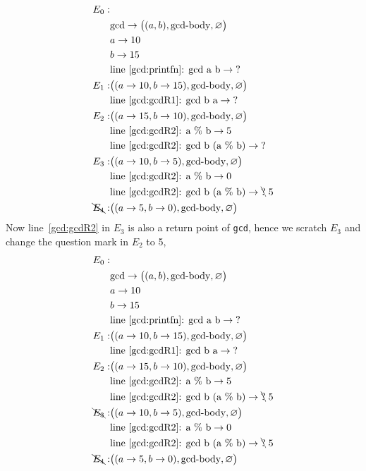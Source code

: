 \begin{align*}
  E_0:&\\
      & \text{gcd} \rightarrow \big((a, b), \text{gcd-body}, \varnothing\big)\\
      & a \rightarrow 10\\
      & b \rightarrow 15\\
      & \text{line~\ref{gcd:printfn}: gcd a b} \rightarrow \text{?}\\
  E_1:& \big((a \rightarrow 10, b \rightarrow 15), \text{gcd-body}, \varnothing\big)\\
      & \text{line~\ref{gcd:gcdR1}: gcd b a} \rightarrow \text{?}\\
  E_2:& \big((a \rightarrow 15, b \rightarrow 10), \text{gcd-body}, \varnothing\big)\\
      & \text{line~\ref{gcd:gcdR2}: a \% b} \rightarrow 5\\
      & \text{line~\ref{gcd:gcdR2}: gcd b (a \% b)} \rightarrow \text{?}\\
  E_3:& \big((a \rightarrow 10, b \rightarrow 5), \text{gcd-body}, \varnothing\big)\\
      & \text{line~\ref{gcd:gcdR2}: a \% b} \rightarrow 0\\
      & \text{line~\ref{gcd:gcdR2}: gcd b (a \% b)} \rightarrow \bcancel{\text{?}}\; 5\\
  \bcancel{E_4}:& \big((a \rightarrow 5, b \rightarrow 0), \text{gcd-body}, \varnothing\big)\\
\end{align*}
Now line~\ref{gcd:gcdR2} in $E_3$ is also a return point of \lstinline!gcd!, hence we scratch $E_3$ and change the question mark in $E_2$ to 5,
\begin{align*}
  E_0:&\\
      & \text{gcd} \rightarrow \big((a, b), \text{gcd-body}, \varnothing\big)\\
      & a \rightarrow 10\\
      & b \rightarrow 15\\
      & \text{line~\ref{gcd:printfn}: gcd a b} \rightarrow \text{?}\\
  E_1:& \big((a \rightarrow 10, b \rightarrow 15), \text{gcd-body}, \varnothing\big)\\
      & \text{line~\ref{gcd:gcdR1}: gcd b a} \rightarrow \text{?}\\
  E_2:& \big((a \rightarrow 15, b \rightarrow 10), \text{gcd-body}, \varnothing\big)\\
      & \text{line~\ref{gcd:gcdR2}: a \% b} \rightarrow 5\\
      & \text{line~\ref{gcd:gcdR2}: gcd b (a \% b)} \rightarrow \bcancel{\text{?}}\; 5\\
  \bcancel{E_3}:& \big((a \rightarrow 10, b \rightarrow 5), \text{gcd-body}, \varnothing\big)\\
      & \text{line~\ref{gcd:gcdR2}: a \% b} \rightarrow 0\\
      & \text{line~\ref{gcd:gcdR2}: gcd b (a \% b)} \rightarrow \bcancel{\text{?}}\; 5\\
  \bcancel{E_4}:& \big((a \rightarrow 5, b \rightarrow 0), \text{gcd-body}, \varnothing\big)\\
\end{align*}
